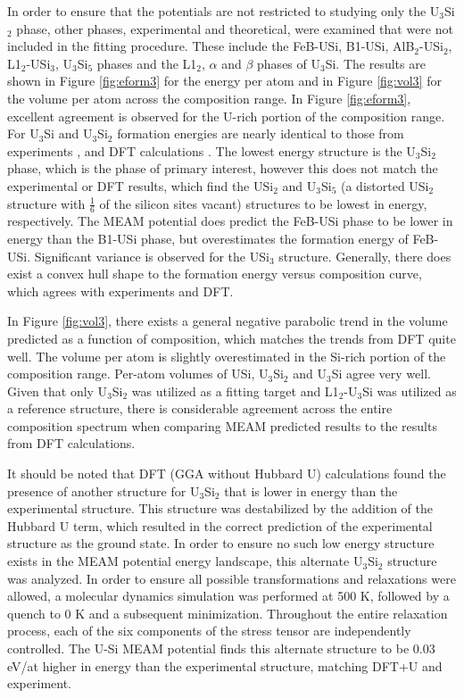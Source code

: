 \documentclass[review]{elsarticle}
\begin{document}
In order to ensure that the potentials are not restricted to studying only the U$_{3}$Si$_{2}$ phase, other phases, experimental and theoretical, were examined that were not included in the fitting procedure.  These include the FeB-USi, B1-USi, AlB$_{2}$-USi$_{2}$, L1$_{2}$-USi$_{3}$, U$_{3}$Si$_{5}$ phases and the L1$_{2}$, $\alpha$ and $\beta$ phases of U$_{3}$Si.  The results are shown in Figure \ref{fig:eform3}  for the energy per atom and in Figure \ref{fig:vol3} for the volume per atom across the composition range.  In Figure \ref{fig:eform3}, excellent agreement is observed for the U-rich portion of the composition range.  For U$_{3}$Si and U$_{3}$Si$_{2}$ formation energies are nearly identical to those from experiments \cite{berche2009}, and DFT calculations \cite{noordhoek2016}.  The lowest energy structure is the U$_{3}$Si$_{2}$ phase, which is the phase of primary interest, however this does not match the experimental or DFT results, which find the USi$_{2}$ and U$_{3}$Si$_{5}$ (a distorted USi$_{2}$ structure with $\frac{1}{6}$ of the silicon sites vacant) structures to be lowest in energy, respectively.  The MEAM potential does predict the FeB-USi phase to be lower in energy than the B1-USi phase, but overestimates the formation energy of FeB-USi.  Significant variance is observed for the USi$_{3}$ structure.  Generally, there does exist a convex hull shape to the formation energy versus composition curve, which agrees with experiments \cite{berche2009} and DFT.  

In Figure \ref{fig:vol3}, there exists a general negative parabolic trend in the volume predicted as a function of composition, which matches the trends from DFT quite well.  The volume per atom is slightly overestimated in the Si-rich portion of the composition range.  Per-atom volumes of USi, U$_{3}$Si$_{2}$ and U$_{3}$Si agree very well.  Given that only U$_{3}$Si$_{2}$ was utilized as a fitting target and L1$_{2}$-U$_{3}$Si was utilized as a reference structure, there is considerable agreement across the entire composition spectrum when comparing MEAM predicted results to the results from DFT calculations.   

It should be noted that DFT (GGA without Hubbard U) calculations \cite{noordhoek2016} found the presence of another structure for U$_{3}$Si$_{2}$ that is lower in energy than the experimental structure.  This structure was destabilized by the addition of the Hubbard U term, which resulted in the correct prediction of the experimental structure as the ground state.  In order to ensure no such low energy structure exists in the MEAM potential energy landscape, this alternate U$_{3}$Si$_{2}$ structure was analyzed.  In order to ensure all possible transformations and relaxations were allowed, a molecular dynamics simulation was performed at 500 K, followed by a quench to 0 K and a subsequent minimization.  Throughout the entire relaxation process, each of the six components of the stress tensor are independently controlled.  The U-Si MEAM potential finds this alternate structure to be 0.03 eV/at higher in energy than the experimental structure, matching DFT+U and experiment.  
\end{document}
